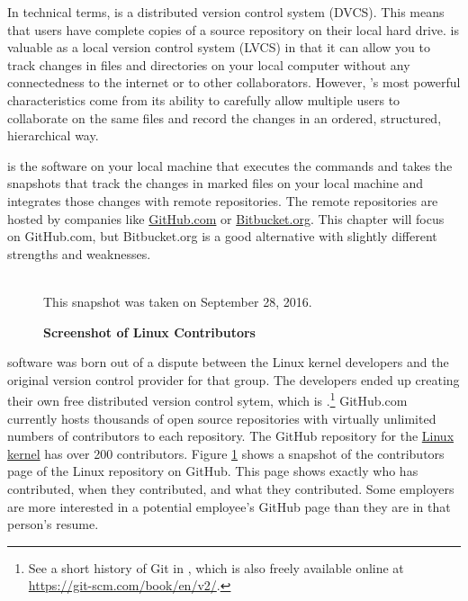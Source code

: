 
In technical terms, \href{https://git-scm.com/}{\git} is a distributed version control system (DVCS). This means that users have complete copies of a source repository on their local hard drive. \git is valuable as a local version control system (LVCS) in that it can allow you to track changes in files and directories on your local computer without any connectedness to the internet or to other collaborators. However, \git's most powerful characteristics come from its ability to carefully allow multiple users to collaborate on the same files and record the changes in an ordered, structured, hierarchical way.

\git is the software on your local machine that executes the commands and takes the snapshots that track the changes in marked files on your local machine and integrates those changes with remote repositories. The remote repositories are hosted by companies like \href{https://github.com/}{GitHub.com} or \href{https://bitbucket.org/}{Bitbucket.org}. This chapter will focus on GitHub.com, but Bitbucket.org is a good alternative with slightly different strengths and weaknesses.

\begin{figure}[htb]\captionsetup{width=6.0in}
  \caption{\textbf{Screenshot of Linux Contributors}}\label{FigLinuxContrib}
   \\
  {\scriptsize{This snapshot was taken on September 28, 2016.}}
\end{figure}

\git software was born out of a dispute between the Linux kernel developers and the original version control provider for that group. The developers ended up creating their own free distributed version control sytem, which is \git.\footnote{See a short history of Git in \href{https://git-scm.com/book/en/v2/Getting-Started-A-Short-History-of-Git}{\citet[p.5]{ChaconStraub:2014}}, which is also freely available online at \href{https://git-scm.com/book/en/v2/}{https://git-scm.com/book/en/v2/}.} GitHub.com currently hosts thousands of open source repositories with virtually unlimited numbers of contributors to each repository. The GitHub repository for the \href{https://github.com/torvalds/linux}{Linux kernel} has over 200 contributors. Figure \ref{FigLinuxContrib} shows a snapshot of the contributors page of the Linux repository on GitHub. This page shows exactly who has contributed, when they contributed, and what they contributed. Some employers are more interested in a potential employee's GitHub page than they are in that person's resume.


